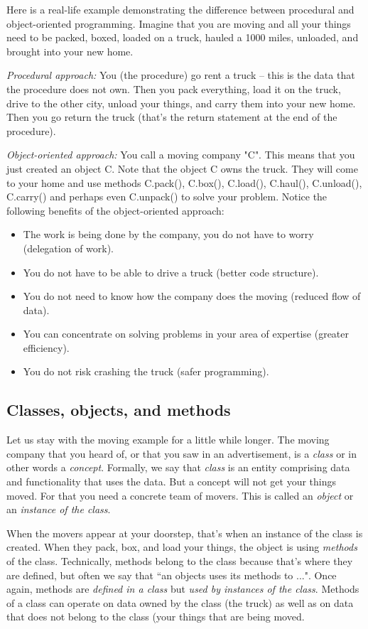 Here is a real-life example demonstrating the difference between 
procedural and object-oriented programming. Imagine that you are moving 
and all your things need to be packed, boxed, loaded on a truck, hauled 
a 1000 miles, unloaded, and brought into your new home. 

{\em Procedural approach:} You (the procedure) 
go rent a truck -- this is the data that the procedure does not own. Then
you pack everything, load it on the truck, drive to the other city, 
unload your things, and carry them into your new home. Then you go 
return the truck (that's the return statement at the end of the procedure).

{\em Object-oriented approach:} You call a moving company "C". This means 
that you just created an object C. Note that the 
object C owns the truck. They will come to your home and use methods 
C.pack(), C.box(), C.load(), C.haul(), C.unload(), C.carry() and perhaps 
even C.unpack() to solve your problem. Notice the following benefits of the object-oriented approach: 
\begin{itemize}
\item The work is being done by the company, 
      you do not have to worry (delegation of work).
\item You do not have to be able to drive a truck (better code structure). 
\item You do not need to know how the company does the moving (reduced flow of data).
\item You can concentrate on solving problems 
      in your area of expertise (greater efficiency).
\item You do not risk crashing the truck (safer programming).
\end{itemize}

\subsection{Classes, objects, and methods}

Let us stay with the moving example for a little while longer. The moving 
company that you heard of, or that you saw in an advertisement, 
is a {\em class} or in other words a {\em concept}. Formally, we say that 
{\em class} is an entity comprising data and functionality that uses the data.
But a concept will not get your things moved. For that you need a concrete team of 
movers. This is called an {\em object} or an {\em instance of the class}. 

When the movers appear at your doorstep, that's when an instance 
of the class is created. When they pack, box, and load your things, the object is using 
{\em methods} of the class. Technically, methods belong to the class because that's
where they are defined, but often we say that ``an objects uses its methods to ...". 
Once again, methods are {\em defined in a class} but {\em used 
by instances of the class}. 
Methods of a class can operate on data owned by the class (the truck) as well as 
on data that does not belong to the class (your things that are being moved.

